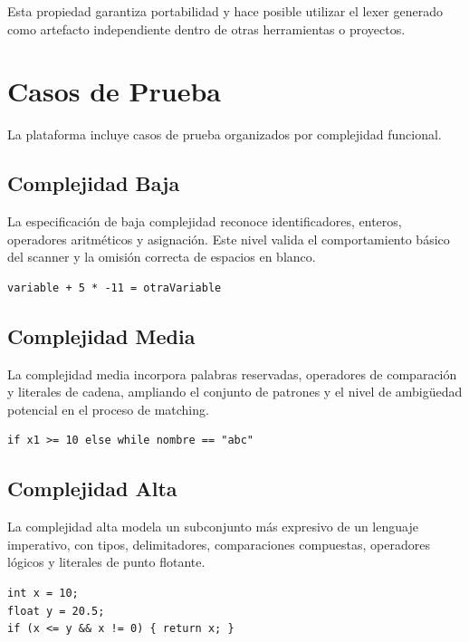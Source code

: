 \documentclass[12pt,a4paper]{article}
\begin{document}
Esta propiedad garantiza portabilidad y hace posible utilizar el lexer generado como artefacto independiente dentro de otras herramientas o proyectos.

\section{Casos de Prueba}

La plataforma incluye casos de prueba organizados por complejidad funcional.

\subsection{Complejidad Baja}

La especificación de baja complejidad reconoce identificadores, enteros, operadores aritméticos y asignación. Este nivel valida el comportamiento básico del scanner y la omisión correcta de espacios en blanco.

\begin{lstlisting}[style=yalexstyle, caption={Ejemplo representativo de entrada para complejidad baja.}]
variable + 5 * -11 = otraVariable
\end{lstlisting}

\subsection{Complejidad Media}

La complejidad media incorpora palabras reservadas, operadores de comparación y literales de cadena, ampliando el conjunto de patrones y el nivel de ambigüedad potencial en el proceso de matching.

\begin{lstlisting}[style=yalexstyle, caption={Ejemplo representativo de entrada para complejidad media.}]
if x1 >= 10 else while nombre == "abc"
\end{lstlisting}

\subsection{Complejidad Alta}

La complejidad alta modela un subconjunto más expresivo de un lenguaje imperativo, con tipos, delimitadores, comparaciones compuestas, operadores lógicos y literales de punto flotante.

\begin{lstlisting}[style=yalexstyle, caption={Ejemplo representativo de entrada para complejidad alta.}]
int x = 10;
float y = 20.5;
if (x <= y && x != 0) { return x; }
\end{lstlisting}
\end{document}
